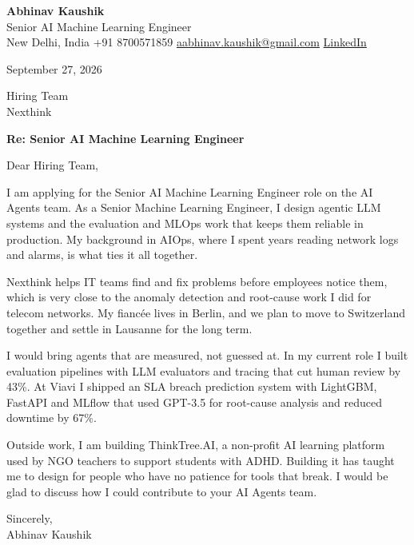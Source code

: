 \documentclass[11pt,a4paper]{article}
\begin{document}
{\Large\bfseries Abhinav Kaushik}\\
Senior AI Machine Learning Engineer\\
New Delhi, India \textbar{} +91 8700571859 \textbar{} \href{mailto:aabhinav.kaushik@gmail.com}{aabhinav.kaushik@gmail.com} \textbar{} \href{https://www.linkedin.com/in/abhinav-kaushik10/}{LinkedIn}  

September 27, 2026

Hiring Team\\
Nexthink

\textbf{Re: Senior AI Machine Learning Engineer}

Dear Hiring Team,

I am applying for the Senior AI Machine Learning Engineer role on the AI Agents team. As a Senior Machine Learning Engineer, I design agentic LLM systems and the evaluation and MLOps work that keeps them reliable in production. My background in AIOps, where I spent years reading network logs and alarms, is what ties it all together.

Nexthink helps IT teams find and fix problems before employees notice them, which is very close to the anomaly detection and root-cause work I did for telecom networks. My fiancée lives in Berlin, and we plan to move to Switzerland together and settle in Lausanne for the long term.

I would bring agents that are measured, not guessed at. In my current role I built evaluation pipelines with LLM evaluators and tracing that cut human review by 43\%. At Viavi I shipped an SLA breach prediction system with LightGBM, FastAPI and MLflow that used GPT-3.5 for root-cause analysis and reduced downtime by 67\%.

Outside work, I am building ThinkTree.AI, a non-profit AI learning platform used by NGO teachers to support students with ADHD. Building it has taught me to design for people who have no patience for tools that break. I would be glad to discuss how I could contribute to your AI Agents team.

Sincerely,\\[4pt]
Abhinav Kaushik
\end{document}
